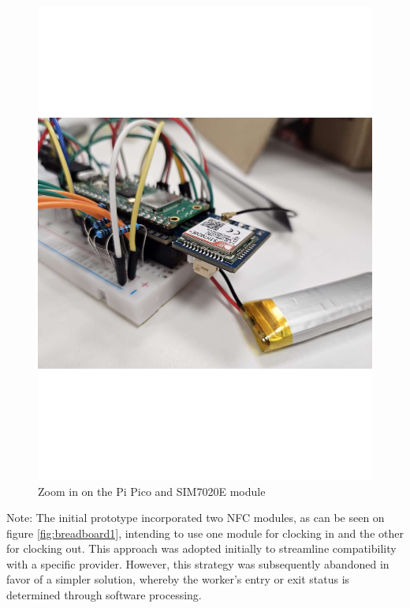 \begin{figure}[h]
\begin{minipage}[b]{0.45\textwidth}
        \includegraphics[width=1\textwidth]{Imagenes/Vectorial/breadboard2.pdf}
        \caption{Zoom in on the Pi Pico and SIM7020E module}
        \label{fig:breadboard2}
    \end{minipage}
\end{figure}

Note: The initial prototype incorporated two NFC modules, as can be seen on figure \ref{fig:breadboard1}, intending to use one module for clocking in and the other for clocking out. This approach was adopted initially to streamline compatibility with a specific provider. However, this strategy was subsequently abandoned in favor of a simpler solution, whereby the worker's entry or exit status is determined through software processing.



